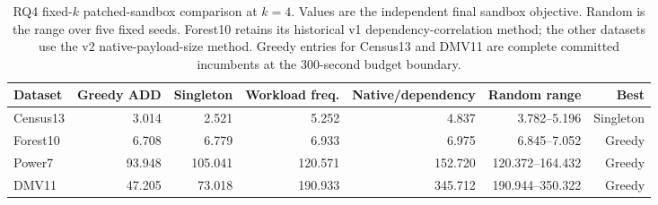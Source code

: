\begin{table}[t]
\centering
\scriptsize
\setlength{\tabcolsep}{1.5pt}
\caption{RQ4 fixed-$k$ patched-sandbox comparison at $k=4$. Values are the
independent final sandbox objective. Random is the range over five fixed
seeds. Forest10 retains its historical v1 dependency-correlation method;
the other datasets use the v2 native-payload-size method. Greedy entries for
Census13 and DMV11 are complete committed incumbents at the 300-second
budget boundary.}
\label{tab:rq4-fixed-k}
\begin{tabular}{lrrrrrr}
\toprule
Dataset & Greedy ADD & Singleton & Workload freq. & Native/dependency & Random range & Best \\
\midrule
Census13 & 3.014 & 2.521 & 5.252 & 4.837 & 3.782--5.196 & Singleton \\
Forest10 & 6.708 & 6.779 & 6.933 & 6.975 & 6.845--7.052 & Greedy \\
Power7 & 93.948 & 105.041 & 120.571 & 152.720 & 120.372--164.432 & Greedy \\
DMV11 & 47.205 & 73.018 & 190.933 & 345.712 & 190.944--350.322 & Greedy \\
\bottomrule
\end{tabular}
\end{table}
